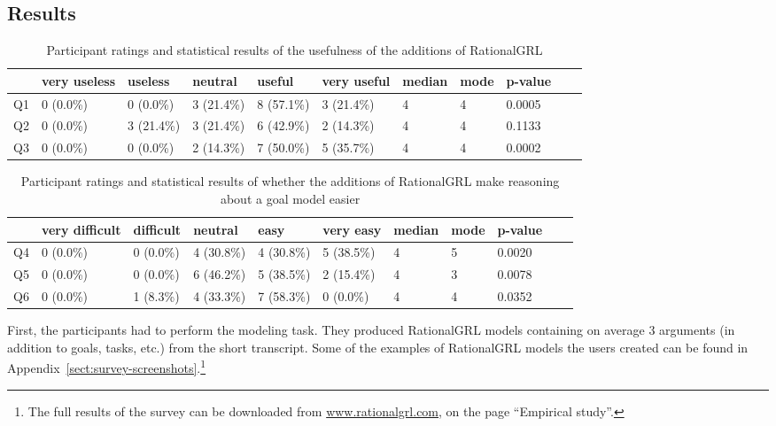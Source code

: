 \subsection{Results}\label{sec:survey:results}

\begin{table*}[t]
\centering
\begin{tabularx}{0.95\textwidth}{l|l|l|l|l|l||l|l|l|l|l}
& very useless & useless & neutral & useful & very useful & median & mode & p-value \\
\hline
Q1 & 0 (0.0\%) & 0 (0.0\%)  & 3 (21.4\%) & 8 (57.1\%) & 3 (21.4\%) & 4 & 4 & 0.0005 \\
Q2 & 0 (0.0\%) & 3 (21.4\%) & 3 (21.4\%) & 6 (42.9\%) & 2 (14.3\%) & 4 & 4 & 0.1133 \\
Q3 & 0 (0.0\%) & 0 (0.0\%)  & 2 (14.3\%) & 7 (50.0\%) & 5 (35.7\%) & 4 & 4 & 0.0002 
\end{tabularx}
\caption{Participant ratings and statistical results of the usefulness of the additions of RationalGRL}
\label{table:survey:table2}
\end{table*}

\begin{table*}[t]
\centering
\begin{tabularx}{0.95\textwidth}{l|l|l|l|l|l||l|l|l|l|l}
& very difficult & difficult & neutral & easy & very easy & median & mode & p-value \\
\hline
Q4  & 0 (0.0\%) & 0 (0.0\%) & 4 (30.8\%) & 4 (30.8\%) & 5 (38.5\%) & 4 & 5 & 0.0020 \\
Q5  & 0 (0.0\%) & 0 (0.0\%) & 6 (46.2\%) & 5 (38.5\%) & 2 (15.4\%) & 4 & 3 & 0.0078\\
Q6 & 0 (0.0\%) & 1 (8.3\%) & 4 (33.3\%) & 7 (58.3\%) & 0 (0.0\%)  & 4 & 4 & 0.0352
\end{tabularx}
\caption{Participant ratings and statistical results of whether the additions of RationalGRL make reasoning about a goal model easier}
\label{table:survey:table3}
\end{table*}

First, the participants had to perform the modeling task. They produced RationalGRL models containing on average 3 arguments (in addition  to goals, tasks, etc.) from the short transcript. Some of the examples of RationalGRL models the users created can be found in Appendix~\ref{sect:survey-screenshots}.\footnote{The full results of the survey can be downloaded from \url{www.rationalgrl.com}, on the page ``Empirical study''.}

